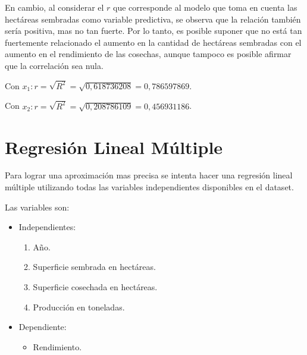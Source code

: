 \documentclass[spanish,12pt,a4paper]{article}
\begin{document}
\begin{enumerate}[label=\alph*)]
		En cambio, al considerar el $r$ que corresponde al modelo que toma en cuenta las hectáreas sembradas como variable predictiva, se observa que la relación también sería positiva, mas no tan fuerte. Por lo tanto, es posible suponer que no está tan fuertemente relacionado el aumento en la cantidad de hectáreas sembradas con el aumento en el rendimiento de las cosechas, aunque tampoco es posible afirmar que la correlación sea nula.
		
		Con $x_1: r = \sqrt{R^2} = \sqrt{0,618736208} = 0,786597869$.
		
		Con $x_2: r = \sqrt{R^2} = \sqrt{0,208786109} = 0,456931186$.

	\end{enumerate}
	
	\section{Regresión Lineal Múltiple}
	Para lograr una aproximación mas precisa se intenta hacer una regresión lineal múltiple utilizando todas las variables independientes disponibles en el dataset.
	
	Las variables son:
	\begin{itemize}
		\item Independientes:
		\begin{enumerate}[label=\arabic*.]
			\item Año.
			\item Superficie sembrada en hectáreas.
			\item Superficie cosechada en hectáreas.
			\item Producción en toneladas.
		\end{enumerate}
		\item Dependiente:
		\begin{itemize}
			\item Rendimiento.
		\end{itemize}
	\end{itemize}
	
\end{document}
